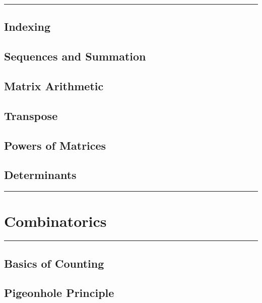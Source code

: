 \documentclass[]{book}
\begin{document}
\begin{center}\rule{0.5\linewidth}{\linethickness}\end{center}

\section{Indexing}\label{indexing}

\section{Sequences and Summation}\label{sequences-and-summation}

\section{Matrix Arithmetic}\label{matrix-arithmetic}

\section{Transpose}\label{transpose}

\section{Powers of Matrices}\label{powers-of-matrices}

\section{Determinants}\label{determinants}

\begin{center}\rule{0.5\linewidth}{\linethickness}\end{center}

\chapter{Combinatorics}\label{combinatorics}

\begin{center}\rule{0.5\linewidth}{\linethickness}\end{center}

\section{Basics of Counting}\label{basics-of-counting}

\section{Pigeonhole Principle}\label{pigeonhole-principle}
\end{document}
